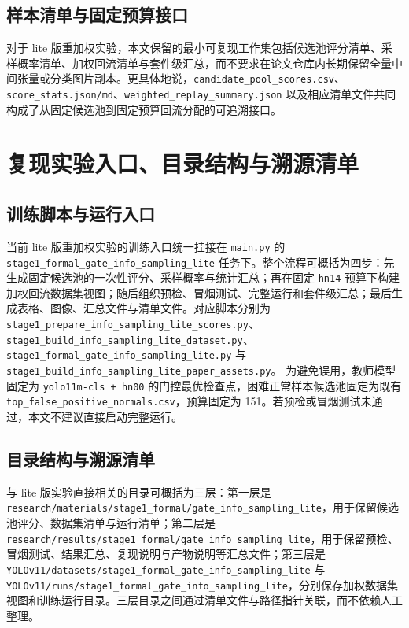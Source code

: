 \documentclass[UTF8,openany,12pt]{ctexbook}
\begin{document}
\section{样本清单与固定预算接口}
对于 lite 版重加权实验，本文保留的最小可复现工作集包括候选池评分清单、采样概率清单、加权回流清单与套件级汇总，而不要求在论文仓库内长期保留全量中间张量或分类图片副本。更具体地说，\texttt{candidate\_pool\_scores.csv}、\texttt{score\_stats.json/md}、\texttt{weighted\_replay\_summary.json} 以及相应清单文件共同构成了从固定候选池到固定预算回流分配的可追溯接口。

\chapter{复现实验入口、目录结构与溯源清单}

\section{训练脚本与运行入口}
当前 lite 版重加权实验的训练入口统一挂接在 \texttt{main.py} 的 \texttt{stage1\_formal\_gate\_info\_sampling\_lite} 任务下。整个流程可概括为四步：先生成固定候选池的一次性评分、采样概率与统计汇总；再在固定 \texttt{hn14} 预算下构建加权回流数据集视图；随后组织预检、冒烟测试、完整运行和套件级汇总；最后生成表格、图像、汇总文件与清单文件。对应脚本分别为 \texttt{stage1\_prepare\_info\_sampling\_lite\_scores.py}、\texttt{stage1\_build\_info\_sampling\_lite\_dataset.py}、\texttt{stage1\_formal\_gate\_info\_sampling\_lite.py} 与 \texttt{stage1\_build\_info\_sampling\_lite\_paper\_assets.py}。
为避免误用，教师模型固定为 \texttt{yolo11m-cls + hn00} 的门控最优检查点，困难正常样本候选池固定为既有 \texttt{top\_false\_positive\_normals.csv}，预算固定为 151。若预检或冒烟测试未通过，本文不建议直接启动完整运行。

\section{目录结构与溯源清单}
与 lite 版实验直接相关的目录可概括为三层：第一层是 \texttt{research/materials/stage1\_formal/gate\_info\_sampling\_lite}，用于保留候选池评分、数据集清单与运行清单；第二层是 \texttt{research/results/stage1\_formal/gate\_info\_sampling\_lite}，用于保留预检、冒烟测试、结果汇总、复现说明与产物说明等汇总文件；第三层是 \texttt{YOLOv11/datasets/stage1\_formal\_gate\_info\_sampling\_lite} 与 \texttt{YOLOv11/runs/stage1\_formal\_gate\_info\_sampling\_lite}，分别保存加权数据集视图和训练运行目录。三层目录之间通过清单文件与路径指针关联，而不依赖人工整理。
\end{document}
